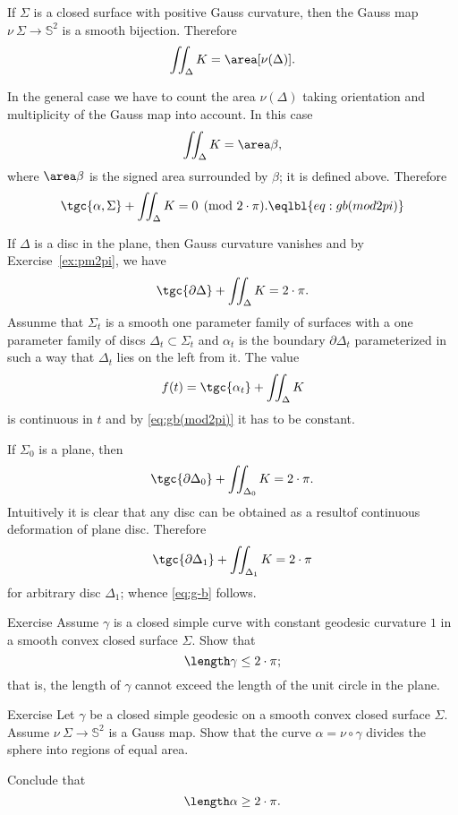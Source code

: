 If $\Sigma$ is a closed surface with positive Gauss curvature, then the Gauss map $\nu\:\Sigma\to\mathbb{S}^2$ is a smooth bijection.
Therefore 
\[\iint_\Delta K=\area[\nu(\Delta)].\]

In the general case we have to count the area $\nu(\Delta)$ taking orientation and multiplicity of the Gauss map into account.
In this case 
\[\iint_\Delta K=\area\beta,\]
where $\area\beta$ is the signed area surrounded by $\beta$; it is defined above.
Therefore 
\[\tgc{\alpha,\Sigma}+\iint_\Delta K=0\pmod{2\cdot \pi}.\eqlbl{eq:gb(mod2pi)}\]

If $\Delta$ is a disc in the plane, then Gauss curvature vanishes and by Exercise~\ref{ex:pm2pi}, we have 
\[\tgc{\partial\Delta}+\iint_\Delta K=2\cdot \pi.\]
Assunme that $\Sigma_t$ is a smooth one parameter family of surfaces with 
a one parameter family of discs $\Delta_t\subset \Sigma_t$ and $\alpha_t$ is the boundary $\partial\Delta_t$ parameterized in such a way that $\Delta_t$ lies on the left from it.
The value 
\[f(t)=\tgc{\alpha_t}+\iint_\Delta K\]
is continuous in $t$ and by \ref{eq:gb(mod2pi)} it has to be constant.

If $\Sigma_0$ is a plane, then 
\[\tgc{\partial\Delta_0}+\iint_{\Delta_0} K=2\cdot \pi.\]
Intuitively it is clear that any disc can be obtained as a resultof continuous deformation of plane disc.
Therefore 
\[\tgc{\partial\Delta_1}+\iint_{\Delta_1} K=2\cdot \pi\]
for arbitrary disc $\Delta_1$; whence \ref{eq:g-b} follows.
\qeds





\begin{thm}{Exercise}
 Assume $\gamma$ is a closed simple curve with constant geodesic curvature $1$ in a smooth convex closed surface $\Sigma$.
 Show that 
 \[\length\gamma\le 2\cdot\pi;\]
that is, the length of $\gamma$ cannot exceed the length of the unit circle in the plane.  
\end{thm}


\begin{thm}{Exercise}
Let $\gamma$ be a closed simple geodesic on a smooth convex closed surface $\Sigma$.
Assume $\nu\:\Sigma\to\mathbb{S}^2$ is a Gauss map.
Show that the curve $\alpha=\nu\circ\gamma$ divides the sphere into regions of equal area.

Conclude that
\[\length \alpha\ge 2\cdot\pi.\]
\end{thm}

